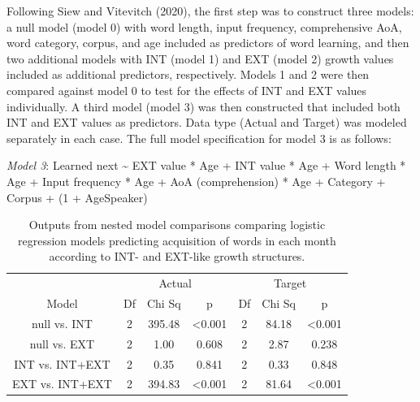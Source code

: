 \documentclass[
  man]{apa6}
\begin{document}
Following Siew and Vitevitch (2020), the first step was to construct three models: a null model (model 0) with word length, input frequency, comprehensive AoA, word category, corpus, and age included as predictors of word learning, and then two additional models with INT (model 1) and EXT (model 2) growth values included as additional predictors, respectively. Models 1 and 2 were then compared against model 0 to test for the effects of INT and EXT values individually. A third model (model 3) was then constructed that included both INT and EXT values as predictors. Data type (Actual and Target) was modeled separately in each case. The full model specification for model 3 is as follows:

\emph{Model 3}: Learned next \textasciitilde{}
EXT value * Age +
INT value * Age +
Word length * Age +
Input frequency * Age +
AoA (comprehension) * Age +
Category +
Corpus +
(1 + Age\textbar Speaker)

\begin{longtable}[t]{ccccccc}
\caption{\label{tab:table-model-outputs}Outputs from nested model comparisons comparing logistic regression models predicting acquisition of words in each month according to INT- and EXT-like growth structures.}\\
\toprule
\multicolumn{1}{c}{ } & \multicolumn{3}{c}{Actual} & \multicolumn{3}{c}{Target} \\
\cmidrule(l{3pt}r{3pt}){2-4} \cmidrule(l{3pt}r{3pt}){5-7}
Model & Df & Chi Sq & p & Df & Chi Sq & p\\
\midrule
null vs. INT & 2 & 395.48 & <0.001 & 2 & 84.18 & <0.001\\
null vs. EXT & 2 & 1.00 & 0.608 & 2 & 2.87 & 0.238\\
INT vs. INT+EXT & 2 & 0.35 & 0.841 & 2 & 0.33 & 0.848\\
EXT vs. INT+EXT & 2 & 394.83 & <0.001 & 2 & 81.64 & <0.001\\
\midrule
\bottomrule
\end{longtable}
\end{document}
